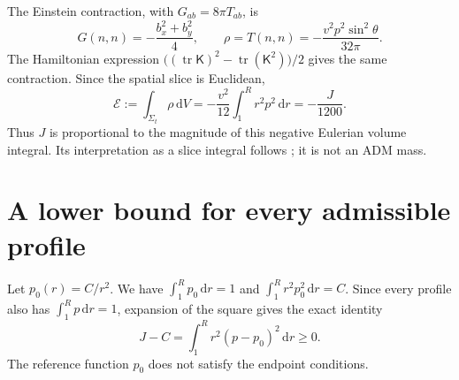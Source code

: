 \documentclass[11pt,a4paper]{article}
\newcommand{\dd}{\,\mathrm d}
\newcommand{\tr}{\operatorname{tr}}
\numberwithin{equation}{section}
\begin{document}
The Einstein contraction, with \(G_{ab}=8\pi T_{ab}\), is
\[
 G(n,n)=-\frac{b_x^2+b_y^2}{4},\qquad
 \rho=T(n,n)=-\frac{v^2p^2\sin^2\theta}{32\pi}.
\]
The Hamiltonian expression
\(\bigl((\tr\mathsf K)^2-\tr(\mathsf K^2)\bigr)/2\)
gives the same contraction. Since the spatial slice is Euclidean,
\begin{equation}\label{eq:physical-energy}
 \mathcal E:=\int_{\Sigma_t}\rho\dd V
       =-\frac{v^2}{12}\int_1^R r^2p^2\dd r
       =-\frac{J}{1200}.
\end{equation}
Thus \(J\) is proportional to the magnitude of this negative Eulerian
volume integral. Its interpretation as a slice integral follows
\cite{alcubierre,lobovisser}; it is not an ADM mass.

\section{A lower bound for every admissible profile}\label{sec:lower}

Let \(p_0(r)=C/r^2\). We have \(\int_1^R p_0\dd r=1\) and
\(\int_1^R r^2p_0^2\dd r=C\). Since every profile also has
\(\int_1^R p\dd r=1\), expansion of the square gives the exact identity
\begin{equation}\label{eq:square}
 J-C=\int_1^R r^2(p-p_0)^2\dd r\ge0.
\end{equation}
The reference function \(p_0\) does not satisfy the endpoint conditions.
\end{document}

